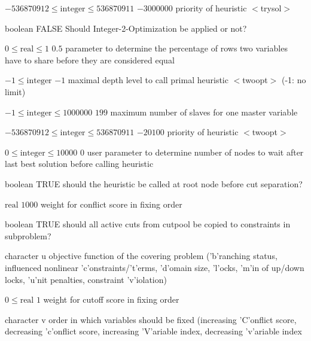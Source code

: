 %
{$-536870912\leq\textrm{integer}\leq536870911$}%
{$-3000000$}%
{priority of heuristic $<$trysol$>$}%
{}

%
{boolean}%
{FALSE}%
{ Should Integer-2-Optimization be applied or not?}%
{}

%
{$0\leq\textrm{real}\leq1$}%
{$0.5$}%
{parameter to determine the percentage of rows two variables have to share before they are considered equal}%
{}

%
{$-1\leq\textrm{integer}$}%
{$-1$}%
{maximal depth level to call primal heuristic $<$twoopt$>$ (-1: no limit)}%
{}

%
{$-1\leq\textrm{integer}\leq1000000$}%
{$199$}%
{maximum number of slaves for one master variable}%
{}

%
{$-536870912\leq\textrm{integer}\leq536870911$}%
{$-20100$}%
{priority of heuristic $<$twoopt$>$}%
{}

%
{$0\leq\textrm{integer}\leq10000$}%
{$0$}%
{user parameter to determine number of nodes to wait after last best solution before calling heuristic}%
{}

%
{boolean}%
{TRUE}%
{should the heuristic be called at root node before cut separation?}%
{}

%
{$\textrm{real}$}%
{$1000$}%
{weight for conflict score in fixing order}%
{}

%
{boolean}%
{TRUE}%
{should all active cuts from cutpool be copied to constraints in subproblem?}%
{}

%
{character}%
{u}%
{objective function of the covering problem ('b'ranching status, influenced nonlinear 'c'onstraints/'t'erms, 'd'omain size, 'l'ocks, 'm'in of up/down locks, 'u'nit penalties, constraint 'v'iolation)}%
{}

%
{$0\leq\textrm{real}$}%
{$1$}%
{weight for cutoff score in fixing order}%
{}

%
{character}%
{v}%
{order in which variables should be fixed (increasing 'C'onflict score, decreasing 'c'onflict score, increasing 'V'ariable index, decreasing 'v'ariable index}%
{}

